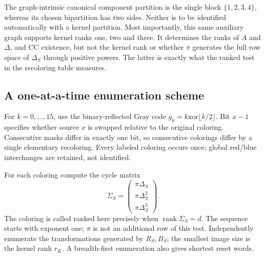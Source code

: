 The graph-intrinsic canonical component partition is the single block
$\{1,2,3,4\}$, whereas its chosen bipartition has two sides. Neither is
to be identified automatically with a kernel partition. Most importantly,
this same auxiliary graph supports kernel ranks one, two and three.
It determines the ranks of $A$ and $\Delta$, and CC existence, but not
the kernel rank or whether $\pi$ generates the full row space of
$\Delta_S$ through positive powers. The latter is exactly what the
ranked test in the recoloring table measures.

\subsection*{A one-at-a-time enumeration scheme}
For $k=0,\ldots,15$, use the binary-reflected Gray code
$g_k=k\mathbin{\mathrm{xor}}\lfloor k/2\rfloor$.
Bit $x-1$ specifies whether source $x$ is swapped relative to the original
coloring. Consecutive masks differ in exactly one bit, so consecutive
colorings differ by a single elementary recoloring. Every labeled coloring
occurs once; global red/blue interchanges are retained, not identified.

For each coloring compute the cycle matrix
\[
 \Sigma_S=\begin{pmatrix}\pi\Delta_S\\\pi\Delta_S^2\\\pi\Delta_S^3\end{pmatrix}.
\]
The coloring is called ranked here precisely when
$\operatorname{rank}\Sigma_S=d$. The sequence starts with exponent one;
$\pi$ is not an additional row of this test.
Independently enumerate the transformations generated by $R_S,B_S$;
the smallest image size is the kernel rank $r_K$.
A breadth-first enumeration also gives shortest reset words.


